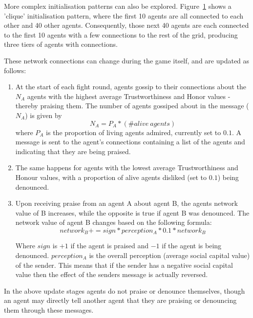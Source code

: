 \begin{figure}
\begin{minipage}{.5\textwidth}
  \label{fig:sc_network_clique}
\end{minipage}
\end{figure}

More complex initialisation patterns can also be explored. Figure~\ref{fig:sc_network_clique} shows a 'clique' initialisation pattern, where the first 10 agents are all connected to each other and 40 other agents. Consequently, those next 40 agents are each connected to the first 10 agents with a few connections to the rest of the grid, producing three tiers of agents with connections.

These network connections can change during the game itself, and are updated as follows:
\begin{enumerate}
    \item At the start of each fight round, agents gossip to their connections about the $N_A$ agents with the highest average Trustworthiness and Honor values - thereby praising them. The number of agents gossiped about in the message ($N_A$) is given by 
    \[
    N_A = P_A * (\#alive\ agents)
    \]
    where $P_A$ is the proportion of living agents admired, currently set to $0.1$. A message is sent to the agent's connections containing a list of the agents and indicating that they are being praised.
    \item The same happens for agents with the lowest average Trustworthiness and Honour values, with a proportion of alive agents disliked (set to $0.1$) being denounced.
    \item Upon receiving praise from an agent A about agent B, the agents network value of B increases, while the opposite is true if agent B was denounced. The network value of agent B changes based on the following formula:
    \[
    network_B += sign * perception_A * 0.1 * network_B
    \]
    
    Where $sign$ is $+1$ if the agent is praised and $-1$ if the agent is being denounced. $perception_A$ is the overall perception (average social capital value) of the sender. This means that if the sender has a negative social capital value then the effect of the senders message is actually reversed.
\end{enumerate}

In the above update stages agents do not praise or denounce themselves, though an agent may directly tell another agent that they are praising or denouncing them through these messages.


